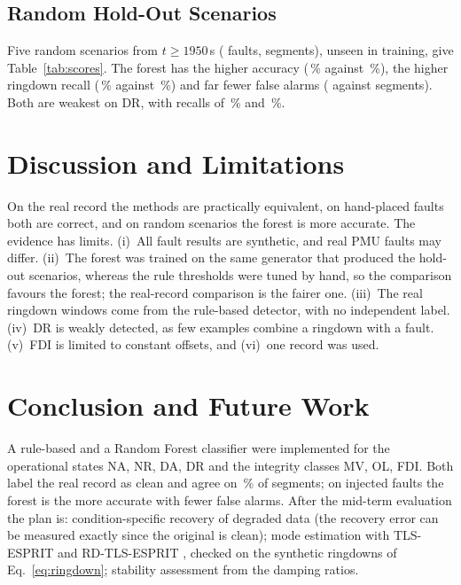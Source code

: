 \documentclass[12pt,letterpaper]{article}
\begin{document}
\subsection{Random Hold-Out Scenarios}
Five random scenarios from $t\ge1950$\,s (\hoEvents{} faults, \hoN{} segments), unseen in training, give Table~\ref{tab:scores}. The forest has the higher accuracy (\hoRfAcc\,\% against \hoRuAcc\,\%), the higher ringdown recall (\hoRfNR\,\% against \hoRuNR\,\%) and far fewer false alarms (\hoFARf{} against \hoFARu{} segments). Both are weakest on DR, with recalls of \hoRfDR\,\% and \hoRuDR\,\%.

\begin{table}[!t]
\centering
\small

\caption{Scores on the five hold-out scenarios.}
\label{tab:scores}
\end{table}

\section{Discussion and Limitations}
On the real record the methods are practically equivalent, on hand-placed faults both are correct, and on random scenarios the forest is more accurate. The evidence has limits. (i)~All fault results are synthetic, and real PMU faults may differ. (ii)~The forest was trained on the same generator that produced the hold-out scenarios, whereas the rule thresholds were tuned by hand, so the comparison favours the forest; the real-record comparison is the fairer one. (iii)~The real ringdown windows come from the rule-based detector, with no independent label. (iv)~DR is weakly detected, as few examples combine a ringdown with a fault. (v)~FDI is limited to constant offsets, and (vi)~one record was used.

\section{Conclusion and Future Work}\label{sec:future}
A rule-based and a Random Forest classifier were implemented for the operational states NA, NR, DA, DR and the integrity classes MV, OL, FDI. Both label the real record as clean and agree on \realAgree\,\% of segments; on injected faults the forest is the more accurate with fewer false alarms. After the mid-term evaluation the plan is: condition-specific recovery of degraded data (the recovery error can be measured exactly since the original is clean); mode estimation with TLS-ESPRIT and RD-TLS-ESPRIT \cite{roy1989}, checked on the synthetic ringdowns of Eq.~\eqref{eq:ringdown}; stability assessment from the damping ratios.
\end{document}
